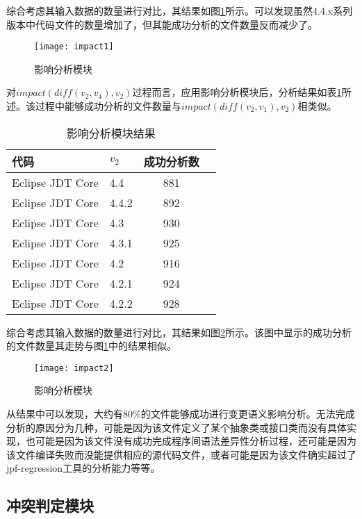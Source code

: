 综合考虑其输入数据的数量进行对比，其结果如图\ref {impact1}所示。可以发现虽然4.4.x系列版本中代码文件的数量增加了，但其能成功分析的文件数量反而减少了。

\begin{figure}[H]
	\centering
	\texttt{[image: impact1]}
	\caption {影响分析模块}
	\label {impact1}	
\end{figure}

对$impact(diff(v_2,v_4),v_2)$过程而言，应用影响分析模块后，分析结果如表\ref {data_impact_2}所述。该过程中能够成功分析的文件数量与$impact(diff(v_2,v_1),v_2)$相类似。

\begin{table}[H]
	\caption{影响分析模块结果}
	\label{data_impact_2}
	\centering
	\begin{tabular}{llcc}
		\toprule[1.5pt]
		{\heiti 代码} & {\heiti $v_2$} & {\heiti 成功分析数}  \\\midrule[1pt]
		Eclipse JDT Core & 4.4	 & 881	\\
		Eclipse JDT Core & 4.4.2 & 892	 	\\
		Eclipse JDT Core & 4.3	 & 930			\\
		Eclipse JDT Core & 4.3.1 & 925	 	\\
		Eclipse JDT Core & 4.2 	 & 916			\\
		Eclipse JDT Core & 4.2.1 	 & 924		\\
		Eclipse JDT Core & 4.2.2 	 & 928		\\
		\bottomrule[1.5pt]
	\end{tabular}
\end{table}

综合考虑其输入数据的数量进行对比，其结果如图\ref {impact2}所示。该图中显示的成功分析的文件数量其走势与图\ref {impact1}中的结果相似。

\begin{figure}
	\centering
	\texttt{[image: impact2]}
	\caption {影响分析模块}
	\label {impact2}	
\end{figure}

从结果中可以发现，大约有80\%的文件能够成功进行变更语义影响分析。无法完成分析的原因分为几种，可能是因为该文件定义了某个抽象类或接口类而没有具体实现，也可能是因为该文件没有成功完成程序间语法差异性分析过程，还可能是因为该文件编译失败而没能提供相应的源代码文件，或者可能是因为该文件确实超过了jpf-regression工具的分析能力等等。

\subsection{冲突判定模块}


